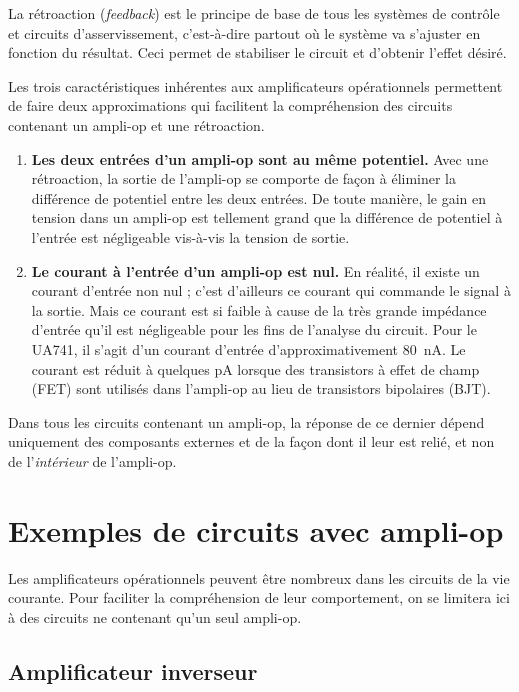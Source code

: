 \documentclass[canadien,12pt,oneside,letterpaper]{article}
\begin{document}
La rétroaction (\textit{feedback}) est le principe de base de tous les systèmes de contrôle et circuits d'asservissement, c'est-à-dire partout où le système va s'ajuster en fonction du résultat. Ceci permet de stabiliser le circuit et d'obtenir l'effet désiré.

Les trois caractéristiques inhérentes aux amplificateurs opérationnels permettent de faire deux approximations qui facilitent la compréhension des circuits contenant un ampli-op et une rétroaction.
\begin{enumerate}
\item \textbf{Les deux entrées d'un ampli-op sont au même potentiel.} Avec une rétroaction, la sortie de l'ampli-op se comporte de façon à éliminer la différence de potentiel entre les deux entrées. De toute manière, le gain en tension dans un ampli-op est tellement grand que la différence de potentiel à l'entrée est négligeable vis-à-vis la tension de sortie.
\item \textbf{Le courant à l'entrée d'un ampli-op est nul.} En réalité, il existe un courant d'entrée non nul ; c'est d'ailleurs ce courant qui commande le signal à la sortie. Mais ce courant est si faible à cause de la très grande impédance d'entrée qu'il est négligeable pour les fins de l'analyse du circuit. Pour le UA741, il s'agit d'un courant d'entrée d'approximativement 80~nA. Le courant est réduit à quelques pA lorsque des transistors à effet de champ (FET) sont utilisés dans l'ampli-op au lieu de transistors bipolaires (BJT).
\end{enumerate}

Dans tous les circuits contenant un ampli-op, la réponse de ce dernier dépend uniquement des composants externes et de la façon dont il leur est relié, et non de l'\textit{intérieur} de l'ampli-op.


\section{Exemples de circuits avec ampli-op}

Les amplificateurs opérationnels peuvent être nombreux dans les circuits de la vie courante. Pour faciliter la compréhension de leur comportement, on se limitera ici à des circuits ne contenant qu'un seul ampli-op.


\subsection{Amplificateur inverseur}
\end{document}
